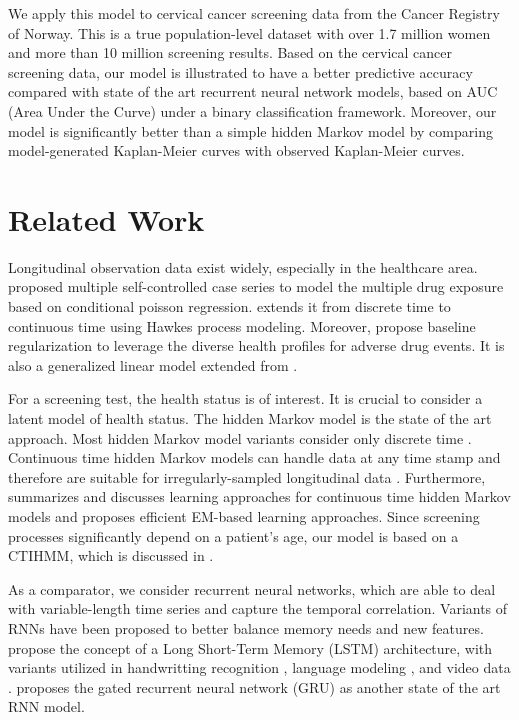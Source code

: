 \documentclass{article}
\begin{document}
We apply this model to cervical cancer screening data from the Cancer Registry of Norway. This is a true population-level dataset with over 1.7 million women and more than 10 million screening results. Based on the cervical cancer screening data, our model is illustrated to have a better predictive accuracy compared with state of the art recurrent neural network models, based on AUC (Area Under the Curve) under a binary classification framework. Moreover, our model is significantly better than a simple hidden Markov model by comparing model-generated Kaplan-Meier curves with observed Kaplan-Meier curves.

\section{Related Work}
Longitudinal observation data exist widely, especially in the healthcare area. \cite{Simpson_2013} proposed multiple self-controlled case series to model the multiple drug exposure based on conditional poisson regression. \cite{Bao_2017} extends it from discrete time to continuous time using Hawkes process modeling. Moreover, \cite{Kuang_2017} propose baseline regularization to leverage the diverse health profiles for adverse drug events. It is also a generalized linear model extended from \cite{Kuang_2016}.

For a screening test, the health status is of interest. It is crucial to consider a latent model of health status. The hidden Markov model is the state of the art approach. Most hidden Markov model variants consider only discrete time \citep{Gael_2008,Beal02,Cem_2014}. Continuous time hidden Markov models can handle data at any time stamp \cite{Cox_1965} and therefore are suitable for irregularly-sampled longitudinal data \citep{Bartolonemo_2011,Liu_2013,Wang_2014}. Furthermore, \cite{Liu_2015} summarizes and discusses learning approaches for continuous time hidden Markov models and proposes efficient EM-based learning approaches. Since screening processes significantly depend on a patient's age, our model is based on a CTIHMM, which is discussed in \cite{Sonnernberg_1993,Myers_2000,Canfell_2004}.

As a comparator, we consider recurrent neural networks, which are able to deal with variable-length time series and capture the temporal correlation. Variants of RNNs have been proposed to better balance memory needs and new features. \cite{Hochreiter_1997, Cho_2014} propose the concept of a Long Short-Term Memory (LSTM) architecture, with variants utilized in handwritting recognition \citep{Doestsch_2014}, language modeling \citep{Stephen_2017}, and video data \citep{Zhang_2016}. \cite{Chung_2014} proposes the gated recurrent neural network (GRU) as another state of the art RNN model.
\end{document}
